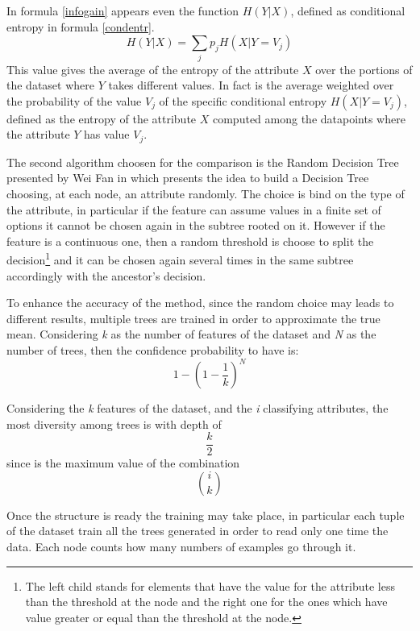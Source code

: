 \documentclass{acm_proc_article-sp-sigmod07}
\begin{document}
In formula \ref{infogain} appears even the function $H(Y|X)$, defined as
conditional entropy in formula \ref{condentr}.
\begin{equation}
H(Y|X) = \sum_{j} p_j H(X| Y  = V_j)
\label{condentr}
\end{equation}
This value gives the average of the entropy of the attribute $X$ over the
portions of the dataset where $Y$ takes different values.
In fact is the average weighted over the probability of the value $V_j$ of
the specific conditional entropy $H(X| Y  = V_j)$, defined as the entropy
of the attribute $X$ computed among the datapoints where the attribute $Y$
has value $V_j$. 

The second algorithm choosen for the comparison is the Random Decision
Tree presented by Wei Fan in \cite{fan:rdt} which presents the idea to
build a Decision Tree choosing, at each node, an attribute randomly. The
choice is bind on the type of the attribute, in particular if the feature
can assume values in a finite set of options it cannot be chosen again in
the subtree rooted on it. However if the feature is a continuous one, then
a random threshold is choose to split the decision\footnote{The left child
stands for elements that have the value for the attribute less than the
threshold at the node and the right one for the ones which have value
greater or equal than the threshold at the node.} and it can be chosen
again several times in the same subtree accordingly with the ancestor's
decision.

To enhance the accuracy of the method, since the random choice may
leads to different results, multiple trees are trained in order to
approximate the true mean. Considering \emph{k} as the number of features
of the dataset and \emph{N} as the number of trees, then the confidence
probability to have is:
\begin{equation}
\label{formula:confidence}
1 - ( 1 - \frac{1}{k})^N
\end{equation}

Considering the \emph{k} features of the dataset, and the \emph{i}
classifying attributes, the most diversity among trees is with depth of 
\begin{equation}
\label{fig:depth}
\frac{k}{2} 
\end{equation}
since is the maximum value of the combination
\begin{equation}
 {{i}\choose{k}}
\end{equation}

Once the structure is ready the training may take place, in
particular each tuple of the dataset train all the trees generated in
order to read only one time the data. Each node counts how many
numbers of examples go through it.
\end{document}
